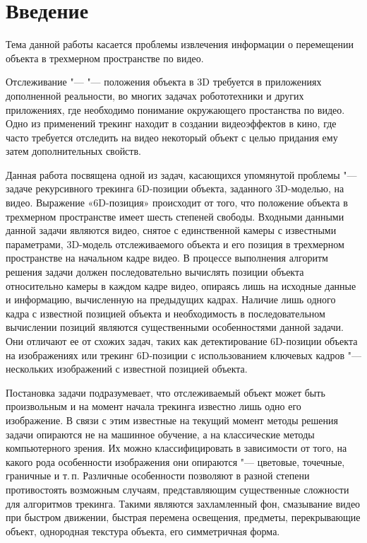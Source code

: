 \section{Введение}


Тема данной работы касается проблемы извлечения информации о перемещении
объекта в трехмерном пространстве по видео.

Отслеживание "---  "--- положения объекта в 3D требуется в
приложениях дополненной реальности\cite{Radkowski}, во многих задачах
робототехники\cite{Robotics} и других приложениях, где необходимо понимание
окружающего простанства по видео.
Одно из применений трекинг находит в создании видеоэффектов в кино, где часто
требуется отследить на видео некоторый объект с целью придания ему затем
дополнительных свойств\cite{Bugaev_2018_ECCV}.

Данная работа посвящена одной из задач, касающихся упомянутой проблемы "---
задаче рекурсивного трекинга 6D-позиции объекта, заданного 3D-моделью, на
видео.
Выражение «6D-позиция» происходит от того, что положение объекта в трехмерном
пространстве имеет шесть степеней свободы\cite{TeorMech}.
Входными данными данной задачи являются видео, снятое с единственной
камеры с известными параметрами, 3D-модель отслеживаемого объекта
и его позиция в трехмерном пространстве на начальном кадре видео.
В процессе выполнения алгоритм решения задачи должен последовательно вычислять
позиции объекта относительно камеры в каждом кадре видео, опираясь лишь на
исходные данные и информацию, вычисленную на предыдущих кадрах.
Наличие лишь одного кадра с известной позицией объекта и необходимость в
последовательном вычислении позиций являются существенными особенностями данной
задачи.
Они отличают ее от схожих задач, таких как детектирование 6D-позиции объекта на
изображениях или трекинг 6D-позиции с использованием ключевых кадров "---
нескольких изображений с известной позицией объекта.

Постановка задачи подразумевает, что отслеживаемый объект может быть
произвольным и на момент начала трекинга известно лишь одно его изображение.
В связи с этим известные на текущий момент методы решения задачи опираются
не на машинное обучение, а на классические методы компьютерного зрения.
Их можно классифицировать в зависимости от того, на какого рода особенности
изображения они опираются "--- цветовые, точечные, граничные и т.\,п.
Различные особенности позволяют в разной степени противостоять возможным
случаям, представляющим существенные сложности для алгоритмов трекинга.
Такими являются захламленный фон, смазывание видео при быстром движении,
быстрая перемена освещения, предметы, перекрывающие объект,
однородная текстура объекта, его симметричная форма.

